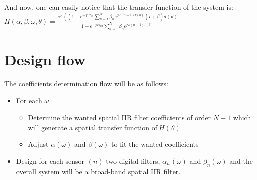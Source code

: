 \documentclass[a4paper,12pt]{report}
\begin{document}
And now, one can easily notice that the transfer function of the system is:\vspace{\baselineskip}
$ H \left(  \alpha , \beta , \omega , \theta  \right) =\frac{ \alpha ^{T} \left(  \left( 1-e^{-j \omega  \tau_{pd}} \sum _{n=1}^{N} \beta _{n}e^{j \omega  \left( n-1 \right)  \tau \left(  \theta  \right) } \right) I+ \beta  \right) d \left(  \theta  \right) }{1-e^{-j \omega  \tau_{pd}} \sum _{n=1}^{N} \beta _{n}e^{j \omega  \left( n-1 \right)  \tau \left(  \theta  \right) }} $
 \par
\noindent 




\newpage

\vspace{14pt}
\noindent 
\section*{Design flow}
 \par
\noindent 
The coefficients determination flow will be as follows:  \par
\noindent 
\begin{itemize}
\item For each $  \omega  $
 \par
\noindent 
\begin{itemize}
\item Determine the wanted spatial IIR filter coefficients of order $ N-1 $
 which will generate a spatial transfer function of$ ~H \left(  \theta  \right)  $
. \par
\noindent 
\item Adjust $  \alpha  \left(  \omega  \right)  $
 and $  \beta  \left(  \omega  \right)  $
 to fit the wanted coefficients \par
\noindent 
\end{itemize}
\item  Design for each sensor $  \left( n \right)  $
 two digital filters, $  \alpha _{n} \left(  \omega  \right)  $
 and $  \beta _{n} \left(  \omega  \right)  $
 and the overall system will be a broad-band spatial IIR filter.\end{itemize}
 \par
\end{document}
